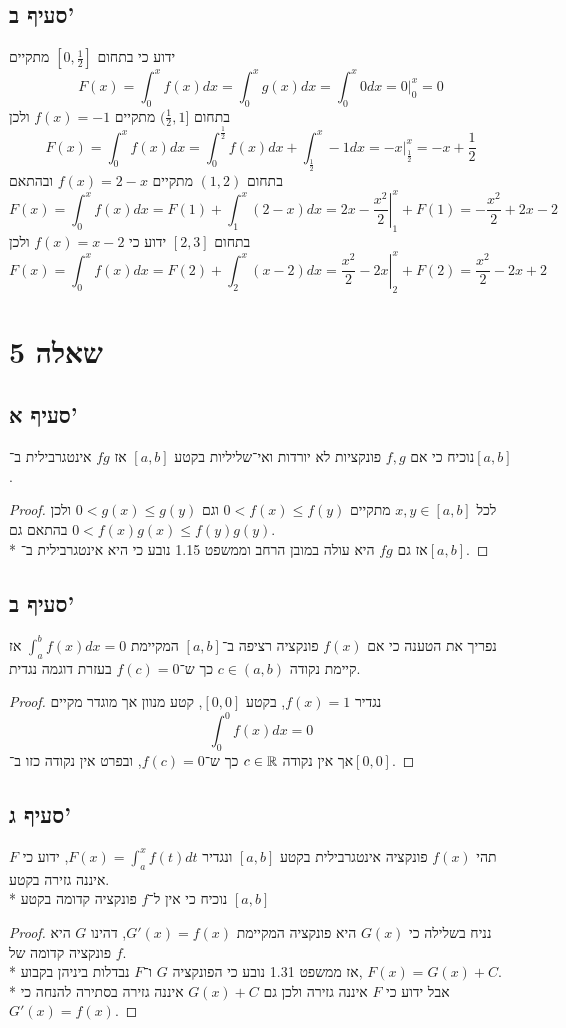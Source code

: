 \subsection{סעיף ב'}
ידוע כי בתחום $[0, \frac{1}{2}]$ מתקיים
\[
	F(x) = \int_0^x f(x) dx = \int_0^x g(x) dx = \int_0^x 0dx = \left. 0 \right|_0^x = 0
\]
בתחום $(\frac{1}{2}, 1]$ מתקיים $f(x) = -1$ ולכן %
\[
	F(x) = \int_0^x f(x) dx = \int_0^\frac{1}{2} f(x) dx + \int_\frac{1}{2}^x -1 dx = \left. -x \right|_\frac{1}{2}^x = -x + \frac{1}{2}
\]
בתחום $(1, 2)$ מתקיים $f(x) = 2 - x$ ובהתאם
\[
	F(x) = \int_0^x f(x) dx = F(1) + \int_1^x (2 - x) dx = \left. 2x - \frac{x^2}{2} \right|_1^x + F(1) = - \frac{x^2}{2} + 2x - 2
\]
בתחום $[2, 3]$ ידוע כי $f(x) = x - 2$ ולכן
\[
	F(x) = \int_0^x f(x) dx = F(2) + \int_2^x (x - 2) dx = \left. \frac{x^2}{2} - 2x \right|_2^x + F(2) = \frac{x^2}{2} - 2x + 2
\]

\section{שאלה 5}
\subsection{סעיף א'}
נוכיח כי אם $f, g$ פונקציות לא יורדות ואי־שליליות בקטע $[a, b]$ אז $fg$ אינטגרבילית ב־$[a, b]$.
\begin{proof}
	לכל $x, y \in [a, b]$ מתקיים $0 < f(x) \le f(y)$ וגם $0 < g(x) \le g(y)$ ולכן בהתאם גם $0 < f(x) g(x) \le f(y) g(y)$. \\*
	אז גם $fg$ היא עולה במובן הרחב וממשפט 1.15 נובע כי היא אינטגרבילית ב־$[a, b]$.
\end{proof}

\subsection{סעיף ב'}
נפריך את הטענה כי אם $f(x)$ פונקציה רציפה ב־$[a, b]$ המקיימת $\int_a^b f(x) dx = 0$ אז קיימת נקודה $c \in (a, b)$ כך ש־$f(c) = 0$ בעזרת דוגמה נגדית.
\begin{proof}
	נגדיר $f(x) = 1$, בקטע $[0, 0]$, קטע מנוון אך מוגדר מקיים
	\[
		\int_0^0 f(x) dx = 0
	\]
	אך אין נקודה $c \in \mathbb{R}$ כך ש־$f(c) = 0$, ובפרט אין נקודה כזו ב־$[0, 0]$.
\end{proof}

\subsection{סעיף ג'}
תהי $f(x)$ פונקציה אינטגרבילית בקטע $[a, b]$ ונגדיר $F(x) = \int_a^x f(t) dt$, ידוע כי $F$ איננה גזירה בקטע. \\*
נוכיח כי אין ל־$f$ פונקציה קדומה בקטע $[a, b]$
\begin{proof}
	נניח בשלילה כי $G(x)$ היא פונקציה המקיימת $G'(x) = f(x)$, דהינו $G$ היא פונקציה קדומה של $f$. \\*
	אז ממשפט 1.31 נובע כי הפונקציה $G$ ו־$F$ נבדלות ביניהן בקבוע, $F(x) = G(x) + C$. \\*
	אבל ידוע כי $F$ איננה גזירה ולכן גם $G(x) + C$ איננה גזירה בסתירה להנחה כי $G'(x) = f(x)$.
\end{proof}

